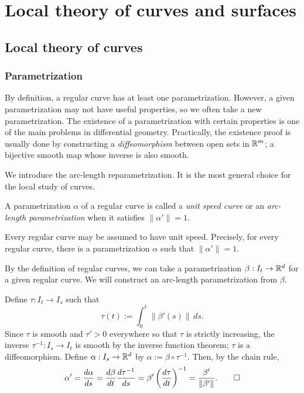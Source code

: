 \documentclass{../note}
\def\a{\alpha}
\begin{document}
\part{Local theory of curves and surfaces}

\chapter{Local theory of curves}

\section{Parametrization}

By definition, a regular curve has at least one parametrization.
However, a given parametrization may not have useful properties, so we often take a new parametrization.
The existence of a parametrization with certain properties is one of the main problems in differential geometry.
Practically, the existence proof is usually done by constructing a \emph{diffeomorphism} between open sets in $\mathbb{R}^m$; a bijective smooth map whose inverse is also smooth.

We introduce the arc-length reparametrization.
It is the most general choice for the local study of curves.
\begin{defn}
A parametrization $\a$ of a regular curve is called a \emph{unit speed curve} or an \emph{arc-length parametrization} when it satisfies $\|\a'\|=1$.
\end{defn}
\begin{thm}
Every regular curve may be assumed to have unit speed.
Precisely, for every regular curve, there is a parametrization $\a$ such that $\|\a'\|=1$.
\end{thm}
\begin{pf}
By the definition of regular curves, we can take a parametrization $\beta:I_t\to\mathbb{R}^d$ for a given regular curve.
We will construct an arc-length parametrization from $\beta$.

Define $\tau:I_t\to I_s$ such that
\[\tau(t):=\int_0^t\|\beta'(s)\|\,ds.\]
Since $\tau$ is smooth and $\tau'>0$ everywhere so that $\tau$ is strictly increasing, the inverse $\tau^{-1}:I_s\to I_t$ is smooth by the inverse function theorem; $\tau$ is a diffeomorphism.
Define $\a:I_s\to\R^d$ by $\a:=\beta\circ\tau^{-1}$.
Then, by the chain rule,
\[\a'=\dd{\a}{s}=\dd{\beta}{t}\dd{\tau^{-1}}{s}=\beta'\left(\dd{\tau}{t}\right)^{-1}=\frac{\beta'}{\|\beta'\|}.\qedhere\]
\end{pf}
\end{document}
